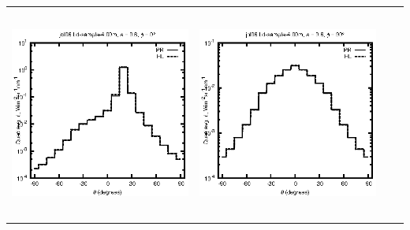 \begin{tabular}{c c c c}
\includegraphics[height=7cm]{../eps/jol06_Ld_sample_4.00m_fwd.eps} &
\includegraphics[height=7cm]{../eps/jol06_Ld_sample_4.00m_cross.eps} \\
\end{tabular}

\pagebreak

